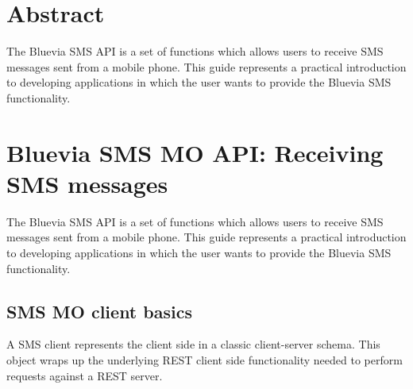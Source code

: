 \hypertarget{blv_sms_mo_guide_sms_mo_abstract_sec}{}\section{Abstract}\label{blv_sms_mo_guide_sms_mo_abstract_sec}
The Bluevia SMS API is a set of functions which allows users to receive SMS messages sent from a mobile phone. This guide represents a practical introduction to developing applications in which the user wants to provide the Bluevia SMS functionality.\hypertarget{blv_sms_mo_guide_blv_sms_mo_api_receiving_sms_messages_sec}{}\section{Bluevia SMS MO API: Receiving SMS messages}\label{blv_sms_mo_guide_blv_sms_mo_api_receiving_sms_messages_sec}
The Bluevia SMS API is a set of functions which allows users to receive SMS messages sent from a mobile phone. This guide represents a practical introduction to developing applications in which the user wants to provide the Bluevia SMS functionality.\hypertarget{blv_sms_mo_guide_sms_mo_client_basics_sec}{}\subsection{SMS MO client basics}\label{blv_sms_mo_guide_sms_mo_client_basics_sec}
A SMS client represents the client side in a classic client-\/server schema. This object wraps up the underlying REST client side functionality needed to perform requests against a REST server.

